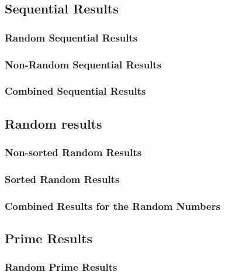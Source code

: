 \subsection{Sequential Results}
\subsubsection{Random Sequential Results}


\subsubsection{Non-Random Sequential Results}


\subsubsection{Combined Sequential Results}
\label{combined_sequential}


\subsection{Random results}
\label{random_results}
\subsubsection{Non-sorted Random Results}
\label{non-sorted_random_results}


\subsubsection{Sorted Random Results}
\subsubsection{Combined Results for the Random Numbers}



\subsection{Prime Results}
\label{prime_results}
\subsubsection{Random Prime Results}
\label{random_prime_results}



